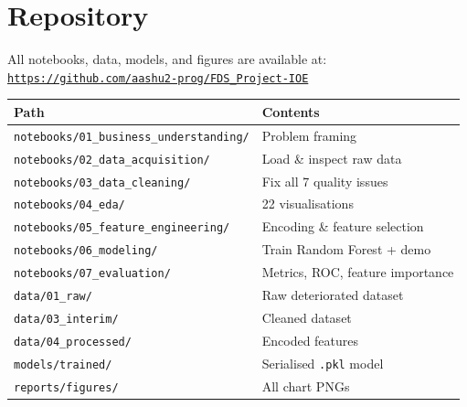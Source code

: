 \documentclass[12pt,a4paper]{article}
\begin{document}
\section*{Repository}

All notebooks, data, models, and figures are available at:\\[0.2cm]
\href{https://github.com/aashu2-prog/FDS_Project-IOE}{\texttt{https://github.com/aashu2-prog/FDS\_Project-IOE}}

\begin{center}
\begin{tabular}{ll}
\toprule
\textbf{Path} & \textbf{Contents} \\
\midrule
\texttt{notebooks/01\_business\_understanding/} & Problem framing \\
\texttt{notebooks/02\_data\_acquisition/}        & Load \& inspect raw data \\
\texttt{notebooks/03\_data\_cleaning/}           & Fix all 7 quality issues \\
\texttt{notebooks/04\_eda/}                      & 22 visualisations \\
\texttt{notebooks/05\_feature\_engineering/}     & Encoding \& feature selection \\
\texttt{notebooks/06\_modeling/}                 & Train Random Forest + demo \\
\texttt{notebooks/07\_evaluation/}               & Metrics, ROC, feature importance \\
\texttt{data/01\_raw/}                           & Raw deteriorated dataset \\
\texttt{data/03\_interim/}                       & Cleaned dataset \\
\texttt{data/04\_processed/}                     & Encoded features \\
\texttt{models/trained/}                         & Serialised \texttt{.pkl} model \\
\texttt{reports/figures/}                        & All chart PNGs \\
\bottomrule
\end{tabular}
\end{center}
\end{document}
